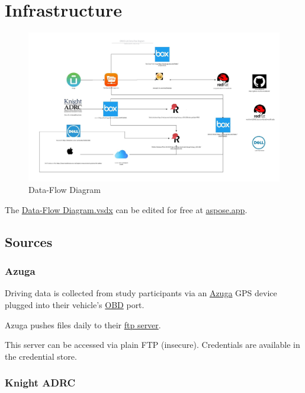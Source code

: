 \documentclass[
]{book}
\begin{document}
\hypertarget{infrastructure}{%
\chapter{Infrastructure}\label{infrastructure}}

\begin{figure}
\centering
\includegraphics[width=1\textwidth,height=\textheight]{img/Data-Flow Diagram.jpg}
\caption{Data-Flow Diagram}
\end{figure}

The \href{img/Data-Flow\%20Diagram.vsdx}{Data-Flow Diagram.vsdx} can be edited for free at \href{https://products.aspose.app/diagram/editor}{aspose.app}.

\hypertarget{sources}{%
\section{Sources}\label{sources}}

\hypertarget{azuga}{%
\subsection{Azuga}\label{azuga}}

Driving data is collected from study participants via an \href{https://www.azuga.com/}{Azuga} GPS device plugged into their vehicle's \href{https://en.wikipedia.org/wiki/On-board_diagnostics}{OBD} port.

Azuga pushes files daily to their \href{ftp://pentaho8.azuga.com}{ftp server}.

This server can be accessed via plain FTP (insecure). Credentials are available in the credential store.

\hypertarget{knight-adrc}{%
\subsection{Knight ADRC}\label{knight-adrc}}
\end{document}
